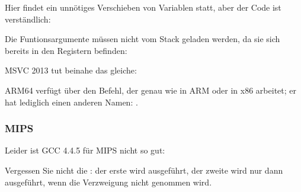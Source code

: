 
Hier findet ein unnötiges Verschieben von Variablen statt, aber der Code ist verständlich:



Die Funtionsargumente müssen nicht vom Stack geladen werden, da sie sich bereits in den Registern befinden:



MSVC 2013 tut beinahe das gleiche:


ARM64 verfügt über den  Befehl, der genau wie  in ARM oder  in x86 arbeitet; er hat
lediglich einen anderen Namen:
.



\subsubsection{MIPS}

Leider ist GCC 4.4.5 für MIPS nicht so gut:

 
Vergessen Sie nicht die : der erste  wird   ausgeführt, der zweite
 wird nur dann ausgeführt, wenn die Verzweigung nicht genommen wird.



